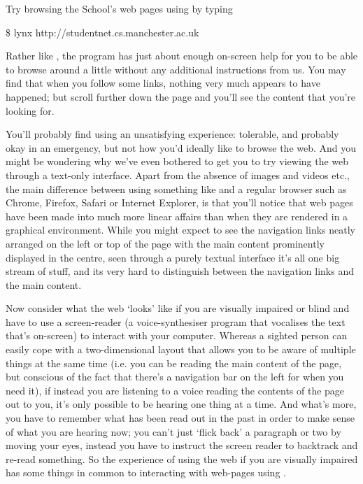 

Try browsing the School's web pages using  by typing

\begin{ttoutenv}
\$ lynx http://studentnet.cs.manchester.ac.uk
\end{ttoutenv}

Rather like , the  program has just about enough on-screen help for you to be able to browse around a little without any additional instructions from us.  You may find that when you follow some links, nothing very much appears to have happened; but scroll further down the page and you'll see the content that you're looking for.

You'll probably find using  an unsatisfying experience: tolerable, and probably okay in an emergency, but not how you'd ideally like to browse the web. And you might be wondering why we've even bothered to get you to try viewing the web through a text-only interface. Apart from the absence of images and videos etc., the main difference between using something like  and a regular browser such as Chrome, Firefox, Safari or Internet Explorer, is that you'll notice that web pages have been made into much more linear affairs than when they are rendered in a graphical environment. While you might expect to see the navigation links neatly arranged on the left or top of the page with the main content prominently displayed in the centre, seen through a purely textual interface it's all one big stream of stuff, and its very hard to distinguish between the navigation links and the main content. 

Now consider what the web `looks' like if you are visually impaired or blind and have to use a screen-reader (a voice-synthesiser program that vocalises the text that's on-screen) to interact with your computer. Whereas a sighted person can easily cope with a two-dimensional layout that allows you to be aware of multiple things at the same time (i.e. you can be reading the main content of the page, but conscious of the fact that there's a navigation bar on the left for when you need it), if instead you are listening to a voice reading the contents of the page out to you, it's only possible to be hearing one thing at a time. And what's more, you have to remember what has been read out in the past in order to make sense of what you are hearing now; you can't just `flick back' a paragraph or two by moving your eyes, instead you have to instruct the screen reader to backtrack and re-read something. So the experience of using the web if you are visually impaired has some things in common to interacting with web-pages using . 

